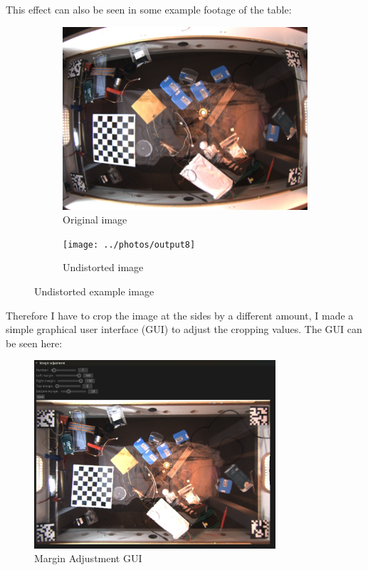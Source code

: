 This effect can also be seen in some example footage of the table:
\begin{figure}[H]
    \centering
    \begin{subfigure}{.5\textwidth}
        \centering
        \includegraphics[width=.8\textwidth]{../photos/original_example8}
        \caption[originalRainbow]{Original image}
        \label{fig:original_example8}
    \end{subfigure}%
    \begin{subfigure}{.5\textwidth}
        \centering
        \texttt{[image: ../photos/output8]}
        \caption[originalRainbow]{Undistorted image}
        \label{fig:undistorted_example8}
    \end{subfigure}
    \caption{Undistorted example image}
    \label{fig:original_undistorted_example}
\end{figure}
Therefore I have to crop the image at the sides by a different amount, I made a simple graphical user interface (GUI) to adjust the cropping values.
The GUI can be seen here:
\begin{figure}[H]
    \centering
    \includegraphics[width=0.8\textwidth]{../photos/margin_adj_gui}
    \caption[marginadjgui]{Margin Adjustment GUI}
    \label{fig:margin_adj_gui}
\end{figure}
